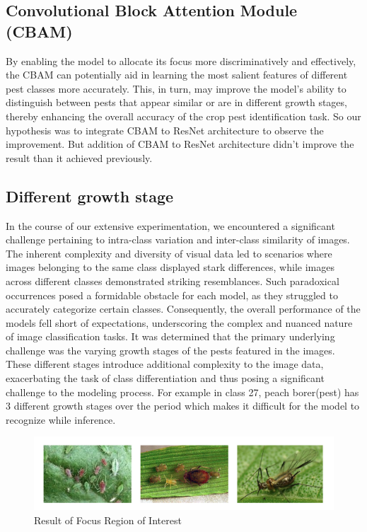 \subsection{Convolutional Block Attention Module (CBAM)}
By enabling the model to allocate its focus more discriminatively and effectively, the CBAM can potentially aid in learning the most salient features of different pest classes more accurately. This, in turn, may improve the model's ability to distinguish between pests that appear similar or are in different growth stages, thereby enhancing the overall accuracy of the crop pest identification task. So our hypothesis was to integrate CBAM to ResNet architecture to observe the improvement. But addition of CBAM to ResNet architecture didn’t improve the result than it achieved previously.


\subsection{Different growth stage}
In the course of our extensive experimentation, we encountered a significant challenge pertaining to intra-class variation and inter-class similarity of images. The inherent complexity and diversity of visual data led to scenarios where images belonging to the same class displayed stark differences, while images across different classes demonstrated striking resemblances. Such paradoxical occurrences posed a formidable obstacle for each model, as they struggled to accurately categorize certain classes. Consequently, the overall performance of the models fell short of expectations, underscoring the complex and nuanced nature of image classification tasks. It was determined that the primary underlying challenge was the varying growth stages of the pests featured in the images. These different stages introduce additional complexity to the image data, exacerbating the task of class differentiation and thus posing a significant challenge to the modeling process. For example in class 27, peach borer(pest) has 3 different growth stages over the period which makes it difficult for the model to recognize while inference.
\begin{figure}
    \centering
    \includegraphics[scale=.4]{figures/Screenshot 2023-05-19 at 5.01.45 AM.png}
    \caption{Result of Focus Region of Interest}
    \label{fig:my_label}
\end{figure}
